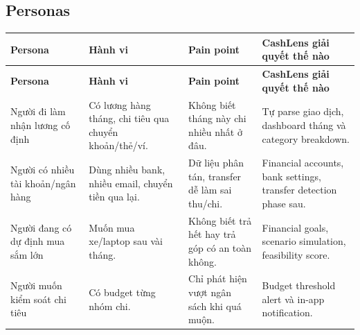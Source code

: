 \documentclass[11pt,a4paper]{article}
\renewcommand{\thead}[1]{\textbf{\color{PrimaryDark}#1}}
\newenvironment{tableblock}{\Needspace{8\baselineskip}\vspace{0.25em}}{\vspace{0.75em}}
\begin{document}
\subsection{Personas}
\begin{tableblock}
\scriptsize
\begin{longtable}{L{3.2cm}L{4.0cm}L{4.2cm}L{4.2cm}}
\thead{Persona} & \thead{Hành vi} & \thead{Pain point} & \thead{CashLens giải quyết thế nào} \\
\endfirsthead
{}\thead{Persona} & \thead{Hành vi} & \thead{Pain point} & \thead{CashLens giải quyết thế nào} \\
\endhead
Người đi làm nhận lương cố định & Có lương hàng tháng, chi tiêu qua chuyển khoản/thẻ/ví. & Không biết tháng này chi nhiều nhất ở đâu. & Tự parse giao dịch, dashboard tháng và category breakdown. \\
Người có nhiều tài khoản/ngân hàng & Dùng nhiều bank, nhiều email, chuyển tiền qua lại. & Dữ liệu phân tán, transfer dễ làm sai thu/chi. & Financial accounts, bank settings, transfer detection phase sau. \\
Người đang có dự định mua sắm lớn & Muốn mua xe/laptop sau vài tháng. & Không biết trả hết hay trả góp có an toàn không. & Financial goals, scenario simulation, feasibility score. \\
Người muốn kiểm soát chi tiêu & Có budget từng nhóm chi. & Chỉ phát hiện vượt ngân sách khi quá muộn. & Budget threshold alert và in-app notification. \\
\end{longtable}
\end{tableblock}
\end{document}
